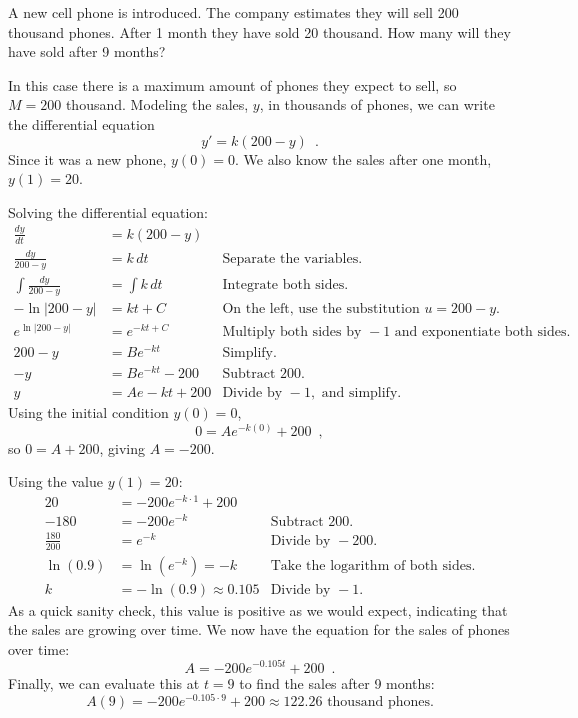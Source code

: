 \begin{example}
A new cell phone is introduced. The company estimates they will sell 200 thousand phones. After 1 month they have sold 20 thousand. How many will they have sold after 9 months?

\begin{solution}
In this case there is a maximum amount of phones they expect to sell, so $M=200$ thousand. Modeling the sales, $y$, in thousands of phones, we can write the differential equation
$$y'=k(200-y) \enspace .$$
Since it was a new phone, $y(0)=0$. We also know the sales after one month, $y(1)=20$.

Solving the differential equation:
\begin{align*}
  \frac{dy}{dt}         &= k(200-y) \\
  \frac{dy}{200-y}      &= k\,dt        & \text{Separate the variables.}\\
  \int\frac{dy}{200-y}  &= \int k\,dt   & \text{Integrate both sides.}\\
  -\ln|200-y|           &= kt+C         & \text{On the left, use the substitution } u=200-y.\\
  e^{\ln|200-y|}        &= e^{-kt+C}    & \text{Multiply both sides by } -1 \text{ and exponentiate both sides.} \\
  200-y                 &= Be^{-kt}     & \text{Simplify.}\\
  -y                    &= Be^{-kt} - 200 & \text{Subtract 200.}\\
  y                     &= Ae-kt+200    & \text{Divide by }-1, \text{ and simplify.}
\end{align*}
Using the initial condition $y(0)=0$,
$$0=Ae^{-k(0)} + 200 \enspace ,$$
so $0=A+200$, giving $A=-200$.

Using the value $y(1)=20$:
\begin{align*}
  20              &= -200e^{-k\cdot 1}+200 \\
  -180            &= -200e^{-k}             &\text{Subtract 200.}\\
  \frac{180}{200} &= e^{-k}                 &\text{Divide by } -200. \\
  \ln(0.9)        &= \ln\left(e^{-k}\right) = -k & \text{Take the logarithm of both sides.}\\
  k               &= -\ln(0.9) \approx   0.105  & \text{Divide by } -1.
\end{align*}
As a quick sanity check, this value is positive as we would expect, indicating that the sales are growing over time. We now have the equation for the sales of phones over time:
$$A=-200e^{-0.105t}+200 \enspace .$$
Finally, we can evaluate this at $t=9$ to find the sales after 9 months:
$$A(9) = -200e^{-0.105\cdot 9} + 200  \approx   122.26 \text{ thousand phones.}$$
\end{solution}\end{example}

